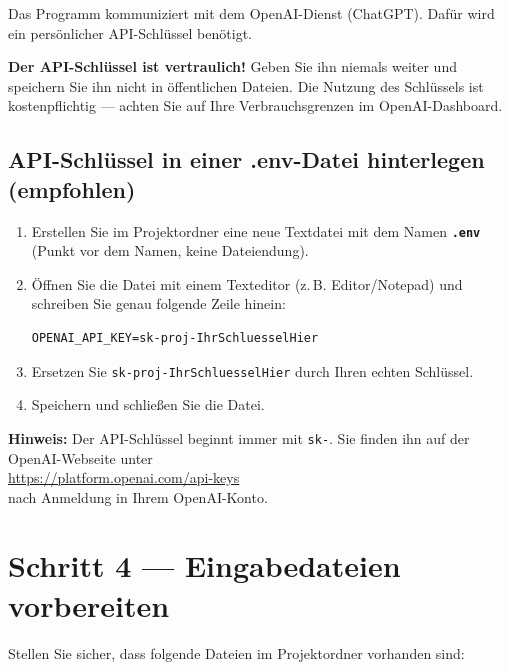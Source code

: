 \documentclass[a4paper,11pt]{article}
\newenvironment{hinweisbox}{%
  \begin{mdframed}[backgroundcolor=hinweis,linecolor=hinweisrand,linewidth=1pt,
    innerleftmargin=8pt,innerrightmargin=8pt,innertopmargin=6pt,innerbottommargin=6pt]
  \small}{%
  \end{mdframed}}
\newenvironment{achtungbox}{%
  \begin{mdframed}[backgroundcolor=achtung,linecolor=achtungrand,linewidth=1pt,
    innerleftmargin=8pt,innerrightmargin=8pt,innertopmargin=6pt,innerbottommargin=6pt]
  \small}{%
  \end{mdframed}}
\begin{document}
Das Programm kommuniziert mit dem OpenAI-Dienst (ChatGPT). Dafür wird ein
persönlicher API-Schlüssel benötigt.

\begin{achtungbox}
\textbf{Der API-Schlüssel ist vertraulich!} Geben Sie ihn niemals weiter und
speichern Sie ihn nicht in öffentlichen Dateien. Die Nutzung des Schlüssels
ist kostenpflichtig — achten Sie auf Ihre Verbrauchsgrenzen im OpenAI-Dashboard.
\end{achtungbox}

\subsection{API-Schlüssel in einer .env-Datei hinterlegen (empfohlen)}

\begin{enumerate}[leftmargin=1.5em, itemsep=4pt]
  \item Erstellen Sie im Projektordner eine neue Textdatei mit dem Namen
        \textbf{\texttt{.env}} (Punkt vor dem Namen, keine Dateiendung).
  \item Öffnen Sie die Datei mit einem Texteditor (z.\,B. Editor/Notepad) und
        schreiben Sie genau folgende Zeile hinein:
\begin{lstlisting}
OPENAI_API_KEY=sk-proj-IhrSchluesselHier
\end{lstlisting}
  \item Ersetzen Sie \texttt{sk-proj-IhrSchluesselHier} durch Ihren echten Schlüssel.
  \item Speichern und schließen Sie die Datei.
\end{enumerate}

\begin{hinweisbox}
\textbf{Hinweis:} Der API-Schlüssel beginnt immer mit \texttt{sk-}. Sie finden
ihn auf der OpenAI-Webseite unter\\
\url{https://platform.openai.com/api-keys}\\
nach Anmeldung in Ihrem OpenAI-Konto.
\end{hinweisbox}

\section{Schritt 4 — Eingabedateien vorbereiten}

Stellen Sie sicher, dass folgende Dateien im Projektordner vorhanden sind:
\end{document}
